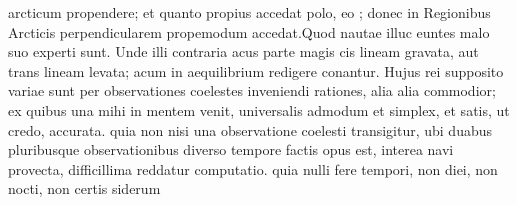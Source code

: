                 arcticum\protect{}            propendere; et quanto propius accedat polo\protect{}, eo ;  donec in Regionibus Arcticis  perpendicularem propemodum accedat.\pend \pstart Quod nautae illuc euntes            malo suo  experti sunt. Unde illi contraria  acus\protect{} parte magis  cis lineam gravata, aut trans lineam levata;             acum in aequilibrium\protect{} redigere conantur. Hujus rei  supposito variae   sunt  per observationes coelestes inveniendi  rationes,            alia alia commodior;  ex quibus una mihi in mentem             venit, universalis admodum et simplex, et  satis, ut credo, accurata.                 quia  non nisi una observatione coelesti            transigitur,  ubi duabus pluribusque observationibus diverso  tempore factis opus            est, interea navi\protect{} provecta, difficillima reddatur computatio.                 quia nulli fere tempori, non            diei, non nocti, non certis siderum
